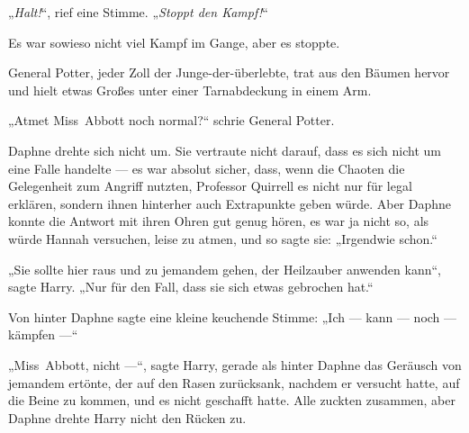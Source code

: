 „\emph{Halt!}“, rief eine Stimme.
„\emph{Stoppt den Kampf!}“

Es war sowieso nicht viel Kampf im Gange, aber es stoppte.

General Potter, jeder Zoll der Junge-der-überlebte, trat aus den Bäumen hervor und hielt etwas Großes unter einer Tarnabdeckung in einem Arm.

„Atmet Miss~Abbott noch normal?“ schrie General Potter.

Daphne drehte sich nicht um. Sie vertraute nicht darauf, dass es sich nicht um eine Falle handelte — es war absolut sicher, dass, wenn die Chaoten die Gelegenheit zum Angriff nutzten, Professor Quirrell es nicht nur für legal erklären, sondern ihnen hinterher auch Extrapunkte geben würde. Aber Daphne konnte die Antwort mit ihren Ohren gut genug hören, es war ja nicht so, als würde Hannah versuchen, leise zu atmen, und so sagte sie:
„Irgendwie schon.“

„Sie sollte hier raus und zu jemandem gehen, der Heilzauber anwenden kann“, sagte Harry.
„Nur für den Fall, dass sie sich etwas gebrochen hat.“

Von hinter Daphne sagte eine kleine keuchende Stimme:
„Ich — kann — noch — kämpfen —“

„Miss~Abbott, nicht —“, sagte Harry, gerade als hinter Daphne das Geräusch von jemandem ertönte, der auf den Rasen zurücksank, nachdem er versucht hatte, auf die Beine zu kommen, und es nicht geschafft hatte. Alle zuckten zusammen, aber Daphne drehte Harry nicht den Rücken zu.

